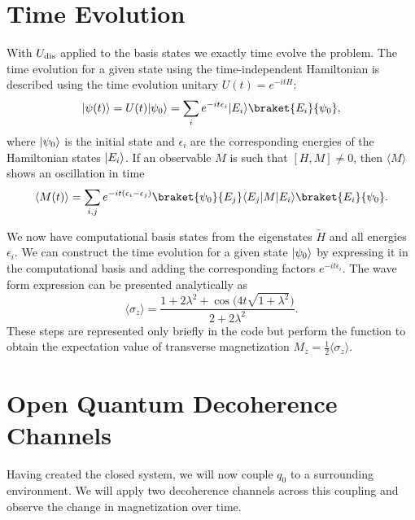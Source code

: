 \documentclass[12pt, twocolumn]{article}
\newcommand*{\eu}{e}
\newcommand*{\iu}{i}
\DeclarePairedDelimiter{\bra}{\langle}{\rvert}
\DeclarePairedDelimiter{\ket}{\lvert}{\rangle}
\begin{document}
  \section{Time Evolution}
  With \( U_{\textnormal{dis}} \) applied to the basis states we exactly time evolve the problem. The time evolution for a given state using the time-independent Hamiltonian is described using the time evolution unitary \( U(t) = \eu^{-\iu t H} \):
  \begin{equation}
    \ket{\psi(t)}
      = U(t) \ket{\psi_{0}}
      = \sum_{i} \eu^{-\iu t \epsilon_{i}} \ket{E_{i}} \braket{E_{i}}{\psi_{0}},
  \end{equation}
  where \( \ket{\psi_{0}} \) is the initial state and \( \epsilon_{i} \) are the corresponding energies of the Hamiltonian states \( \ket{E_{i}} \). If an observable \( M \) is such that \( [H, M] \neq 0 \), then \( \langle M \rangle \) shows an oscillation in time
  \begin{equation}
    \langle M(t) \rangle
      = \sum_{i, j} \eu^{-\iu t (\epsilon_{i} - \epsilon_{j})}
        \braket{\psi_{0}}{E_{j}} \bra{E_{j}} M \ket{E_{i}}
        \braket{E_{i}}{\psi_{0}}.
  \end{equation}

  We now have computational basis states from the eigenstates \( \tilde{H} \) and all energies \( \epsilon_{i} \). We can construct the time evolution for a given state \( \ket{\psi_{0}} \) by expressing it in the computational basis and adding the corresponding factors \( \eu^{-\iu t \epsilon_{i}} \). The wave form expression can be presented analytically as
  \begin{equation}
    \langle \sigma_{z} \rangle
      = \frac{1 + 2 \lambda^{2} + \cos \bigl( 4 t \sqrt{1 + \lambda^{2}} \bigr)}
             {2 + 2 \lambda^{2}}.
  \end{equation}
  These steps are represented only briefly in the code but perform the function to obtain the expectation value of transverse magnetization \( M_{z} = \frac{1}{2} \langle \sigma_{z} \rangle \).

  \section{Open Quantum Decoherence Channels}
  Having created the closed system, we will now couple \( q_{0} \) to a surrounding environment. We will apply two decoherence channels across this coupling and observe the change in magnetization over time.
\end{document}
